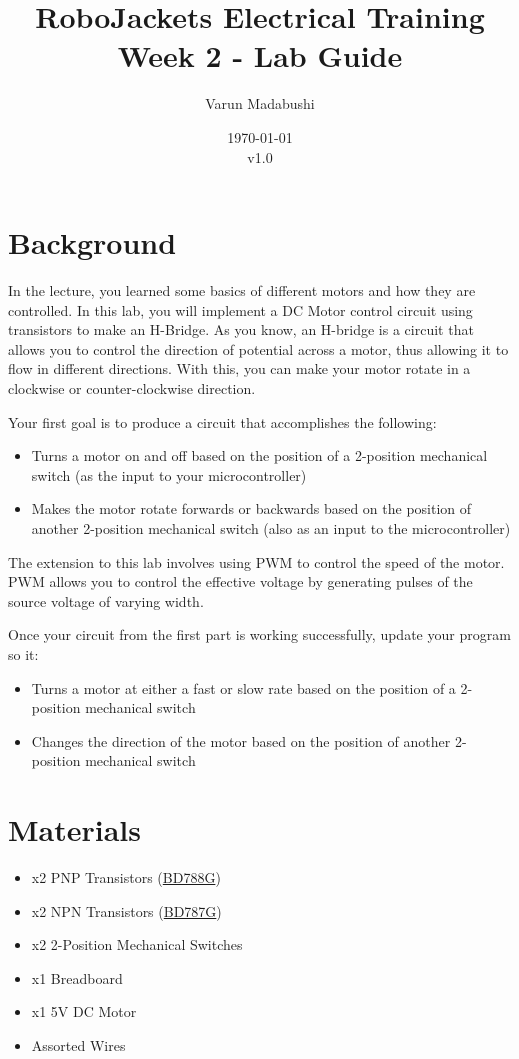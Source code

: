\documentclass{article}
\title{RoboJackets Electrical Training Week 2 - Lab Guide}
\author{Varun Madabushi}
\date{\today\\v1.0}
\begin{document}
\maketitle{}
\setcounter{tocdepth}{2}
\tableofcontents
\pagebreak

\section{Background}
In the lecture, you learned some basics of different motors and how they are controlled. In this lab, you will implement a DC Motor control circuit using transistors to make an H-Bridge. As you know, an H-bridge is a circuit that allows you to control the direction of potential across a motor, thus allowing it to flow in different directions. With this, you can make your motor rotate in a clockwise or counter-clockwise direction.
\vspace{6pt}\par
Your first goal is to produce a circuit that accomplishes the following:
\begin{itemize}
    \item Turns a motor on and off based on the position of a 2-position mechanical switch (as the input to your microcontroller)
    \item Makes the motor rotate forwards or backwards based on the position of another 2-position mechanical switch (also as an input to the microcontroller)
\end{itemize}

\vspace{6pt}\par
The extension to this lab involves using PWM to control the speed of the motor. PWM allows you to control the effective voltage by generating pulses of the source voltage of varying width. 

Once your circuit from the first part is working successfully, update your program so it:
\begin{itemize}
    \item Turns a motor at either a fast or slow rate based on the position of a 2-position mechanical switch
    \item Changes the direction of the motor based on the position of another 2-position mechanical  switch
\end{itemize}


\section{Materials}
\begin{itemize}
	\item x2 PNP Transistors (\href{http://www.onsemi.com/pub/Collateral/BD787-D.PDF}{BD788G})
	\item x2 NPN Transistors (\href{http://www.onsemi.com/pub/Collateral/BD787-D.PDF}{BD787G}) 
	\item x2 2-Position Mechanical Switches 
	\item x1 Breadboard 
	\item x1 5V DC Motor 
	\item Assorted Wires
\end{itemize}
\end{document}
